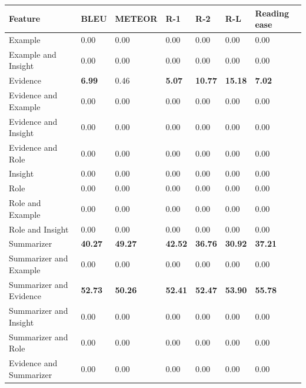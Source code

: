 \begin{tabular}{|l|l|l|l|l|l|l|}
\hline
\textbf{Feature} & BLEU & METEOR & R-1 & R-2 & R-L & Reading ease \\
 \hline
 Example & 0.00 & 0.00 & 0.00 & 0.00 & 0.00 & 0.00 \\
 \hline
 Example and Insight & 0.00 & 0.00 & 0.00 & 0.00 & 0.00 & 0.00 \\
 \hline
 Evidence & \textbf{6.99} & 0.46 & \textbf{5.07} & \textbf{10.77} & \textbf{15.18} & \textbf{7.02} \\
 \hline
 Evidence and Example & 0.00 & 0.00 & 0.00 & 0.00 & 0.00 & 0.00 \\
 \hline
 Evidence and Insight & 0.00 & 0.00 & 0.00 & 0.00 & 0.00 & 0.00 \\
 \hline
 Evidence and Role & 0.00 & 0.00 & 0.00 & 0.00 & 0.00 & 0.00 \\
 \hline
 Insight & 0.00 & 0.00 & 0.00 & 0.00 & 0.00 & 0.00 \\
 \hline
 Role & 0.00 & 0.00 & 0.00 & 0.00 & 0.00 & 0.00 \\
 \hline
 Role and Example & 0.00 & 0.00 & 0.00 & 0.00 & 0.00 & 0.00 \\
 \hline
 Role and Insight & 0.00 & 0.00 & 0.00 & 0.00 & 0.00 & 0.00 \\
 \hline
 Summarizer & \textbf{40.27} & \textbf{49.27} & \textbf{42.52} & \textbf{36.76} & \textbf{30.92} & \textbf{37.21} \\
 \hline
 Summarizer and Example & 0.00 & 0.00 & 0.00 & 0.00 & 0.00 & 0.00 \\
 \hline
 Summarizer and Evidence & \textbf{52.73} & \textbf{50.26} & \textbf{52.41} & \textbf{52.47} & \textbf{53.90} & \textbf{55.78} \\
 \hline
 Summarizer and Insight & 0.00 & 0.00 & 0.00 & 0.00 & 0.00 & 0.00 \\
 \hline
 Summarizer and Role & 0.00 & 0.00 & 0.00 & 0.00 & 0.00 & 0.00 \\
 \hline
 Evidence and Summarizer & 0.00 & 0.00 & 0.00 & 0.00 & 0.00 & 0.00 \\
\hline
\end{tabular}
